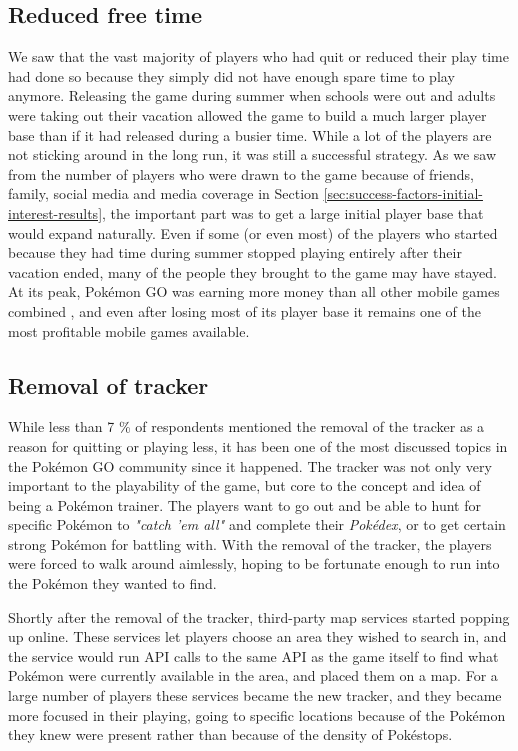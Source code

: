 \subsection{Reduced free time}
\label{sec:reduced-free-time}
We saw that the vast majority of players who had quit or reduced their play time had done so because they simply did not have enough spare time to play anymore. Releasing the game during summer when schools were out and adults were taking out their vacation allowed the game to build a much larger player base than if it had released during a busier time. While a lot of the players are not sticking around in the long run, it was still a successful strategy. As we saw from the number of players who were drawn to the game because of friends, family, social media and media coverage in Section \ref{sec:success-factors-initial-interest-results}, the important part was to get a large initial player base that would expand naturally. Even if some (or even most) of the players who started because they had time during summer stopped playing entirely after their vacation ended, many of the people they brought to the game may have stayed. At its peak, Pokémon GO was earning more money than all other mobile games combined , and even after losing most of its player base it remains one of the most profitable mobile games available.

\subsection{Removal of tracker}
While less than 7 \% of respondents mentioned the removal of the tracker as a reason for quitting or playing less, it has been one of the most discussed topics in the Pokémon GO community since it happened. The tracker was not only very important to the playability of the game, but core to the concept and idea of being a Pokémon trainer. The players want to go out and be able to hunt for specific Pokémon to \emph{"catch 'em all"} and complete their \emph{Pokédex}, or to get certain strong Pokémon for battling with. With the removal of the tracker, the players were forced to walk around aimlessly, hoping to be fortunate enough to run into the Pokémon they wanted to find.

Shortly after the removal of the tracker, third-party map services started popping up online. These services let players choose an area they wished to search in, and the service would run API calls to the same API as the game itself to find what Pokémon were currently available in the area, and placed them on a map. For a large number of players these services became the new tracker, and they became more focused in their playing, going to specific locations because of the Pokémon they knew were present rather than because of the density of Pokéstops.

